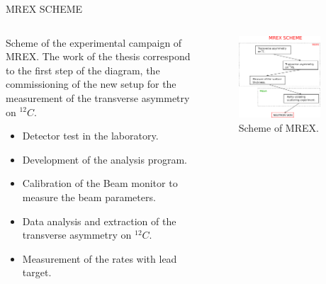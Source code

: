 \documentclass[9pt,a4paper]{beamer}
\begin{document}
\begin{frame}[t]{MREX SCHEME}
\begin{columns}[T]
\begin{column}{0.40\textwidth}
Scheme of the experimental campaign of MREX. The work of the thesis correspond to the first step of the diagram, the commissioning of the new setup for the measurement of the transverse asymmetry on $^{12}C$.

\begin{itemize}
\item Detector test in the laboratory.
\item Development of the analysis program.
\item Calibration of the Beam monitor to measure the beam parameters.
\item Data analysis and extraction of the transverse asymmetry on $^{12}C$.
\item Measurement of the rates with lead target.
\end{itemize}

\end{column}
\begin{column}{0.60\textwidth}
\begin{figure}
\centering
\includegraphics[width = 0.85\textwidth]{SchemeMrex.pdf}
\caption{\footnotesize Scheme of MREX.}
\end{figure}
\end{column}
\end{columns}
\end{frame}
\end{document}
